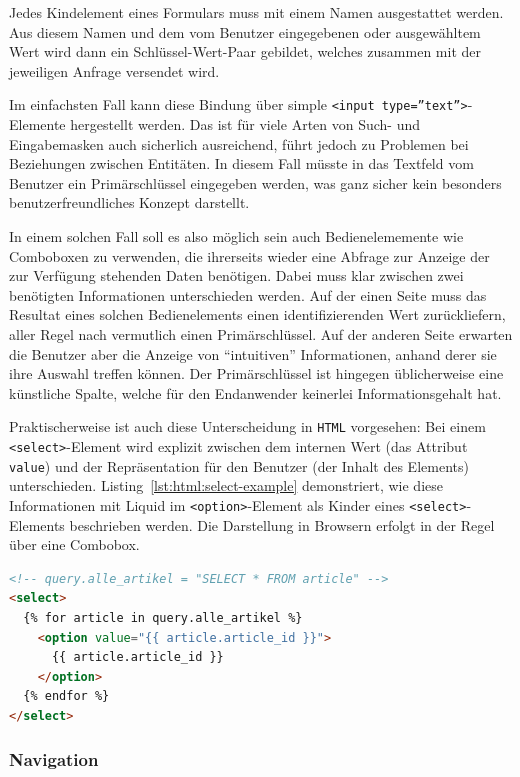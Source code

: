 Jedes Kindelement eines Formulars muss mit einem Namen ausgestattet werden. Aus diesem Namen und dem vom Benutzer eingegebenen oder ausgewähltem Wert wird dann ein Schlüssel-Wert-Paar gebildet, welches zusammen mit der jeweiligen Anfrage versendet wird.

Im einfachsten Fall kann diese Bindung über simple \texttt{<input type=''text''>}-Elemente hergestellt werden. Das ist für viele Arten von Such- und Eingabemasken auch sicherlich ausreichend, führt jedoch zu Problemen bei Beziehungen zwischen Entitäten. In diesem Fall müsste in das Textfeld vom Benutzer ein Primärschlüssel eingegeben werden, was ganz sicher kein besonders benutzerfreundliches Konzept darstellt.

In einem solchen Fall soll es also möglich sein auch Bedienelememente wie Comboboxen zu verwenden, die ihrerseits wieder eine Abfrage zur Anzeige der zur Verfügung stehenden Daten benötigen. Dabei muss klar zwischen zwei benötigten Informationen unterschieden werden. Auf der einen Seite muss das Resultat eines solchen Bedienelements einen identifizierenden Wert zurückliefern, aller Regel nach vermutlich einen Primärschlüssel. Auf der anderen Seite erwarten die Benutzer aber die Anzeige von \enquote{intuitiven} Informationen, anhand derer sie ihre Auswahl treffen können. Der Primärschlüssel ist hingegen üblicherweise eine künstliche Spalte, welche für den Endanwender keinerlei Informationsgehalt hat.

Praktischerweise ist auch diese Unterscheidung in \texttt{HTML} vorgesehen: Bei einem \texttt{<select>}-Element wird explizit zwischen dem internen Wert (das Attribut \texttt{value}) und der Repräsentation für den Benutzer (der Inhalt des Elements) unterschieden. Listing~\ref{lst:html:select-example} demonstriert, wie diese Informationen mit Liquid im \texttt{<option>}-Element als Kinder eines \texttt{<select>}-Elements beschrieben werden. Die Darstellung in Browsern erfolgt in der Regel über eine Combobox.

\begin{lstlisting}[float,language=HTML, caption=Containerelemente mit Kindern, label=lst:html:select-example]
<!-- query.alle_artikel = "SELECT * FROM article" -->
<select>
  {% for article in query.alle_artikel %}
    <option value="{{ article.article_id }}">
      {{ article.article_id }}
    </option>
  {% endfor %}
</select>
\end{lstlisting}

\subsubsection{Navigation}
\label{sec:concept-navigation}


